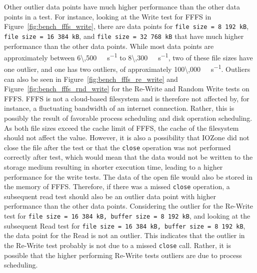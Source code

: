Other outlier data points have much higher performance than the other data points in a test. For instance, looking at the Write test for \gls{FFFS} in Figure~\ref{fig:bench_fffs_write}, there are data points for \texttt{file size = 8\,192\,kB}, \texttt{file size = 16\,384\,kB}, and \texttt{file size = 32\,768\,kB} that have much higher performance than the other data points. While most data points are approximately between \SI[per-mode = symbol]{6\,500}{\kilo\byte\per\second} to \SI[per-mode = symbol]{8\,300}{\kilo\byte\per\second}, two of these file sizes have one outlier, and one has two outliers, of approximately \SI[per-mode = symbol]{100\,000}{\kilo\byte\per\second}. Outliers can also be seen in Figure~\ref{fig:bench_fffs_re_write} and Figure~\ref{fig:bench_fffs_rnd_write} for the \mbox{Re-Write} and Random Write tests on \gls{FFFS}. \gls{FFFS} is not a cloud-based filesystem and is therefore not affected by, for instance, a fluctuating bandwidth of an internet connection. Rather, this is possibly the result of favorable process scheduling and disk operation scheduling. As both file sizes exceed the cache limit of \gls{FFFS}, the cache of the filesystem should not affect the value. However, it is also a possibility that IOZone did not close the file after the test or that the \texttt{close} operation was not performed correctly after test, which would mean that the data would not be written to the storage medium resulting in shorter execution time, leading to a higher performance for the write tests. The data of the open file would also be stored in the memory of \gls{FFFS}. Therefore, if there was a missed \texttt{close} operation, a subsequent read test should also be an outlier data point with higher performance than the other data points. Considering the outlier for the \mbox{Re-Write} test for \texttt{file size = 16\,384\,kB, buffer size = 8\,192\,kB}, and looking at the subsequent Read test for \texttt{file size = 16\,384\,kB, buffer size = 8\,192\,kB}, the data point for the Read is not an outlier. This indicates that the outlier in the \mbox{Re-Write} test probably is not due to a missed \texttt{close} call. Rather, it is possible that the higher performing \mbox{Re-Write} tests outliers are due to process scheduling. 

